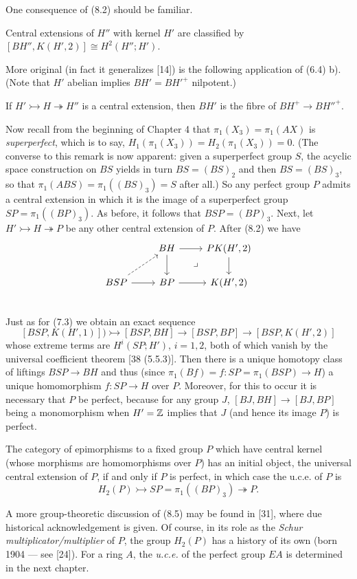 One consequence of (8.2) should be familiar.
\begin{corollary}
  Central extensions of $H''$ with kernel $H'$ are classified by $[BH'', K(H',2)]\cong H^2(H''; H')$.
\end{corollary}
More original (in fact it generalizes [14]) is the following application of (6.4) b). (Note that $H'$ abelian implies $BH' = {BH'}^+$ nilpotent.)
\begin{corollary}
  If $H'\rightarrowtail H \twoheadrightarrow H''$ is a central extension, then $BH'$ is the fibre of $BH^+ \longrightarrow {BH''}^+$.
\end{corollary}
Now recall from the beginning of Chapter 4 that $\pi_1(X_3) = \pi_1 (AX)$ is {\em superperfect}, which is to say, $H_1 (\pi_1 (X_3)) = H_2(\pi_1 (X_3)) = 0$. (The converse to this remark is now apparent: given a superperfect group $S$, the acyclic space construction on $BS$ yields in turn $BS = (BS)_2$ and then $BS = (BS)_3$, so that $\pi_1 (ABS) = \pi_1((BS)_3) = S$ after all.) So any perfect group $P$ admits a central extension in which it is the image of a superperfect group $SP = \pi_1((BP)_3)$. As before, it follows that $BSP = (BP)_3$. Next, let $H'\rightarrowtail H \twoheadrightarrow P$ be any other central extension of $P$. After (8.2)
we have
\[
\begin{tikzcd}
  & BH \arrow[d] \arrow[r] \arrow[dr, phantom, "\lrcorner"] &PK(H',2) \arrow[d] \\
 BSP \arrow[ru,dashrightarrow] \arrow[r] &BP \arrow[r] & K(H',2)\\  
\end{tikzcd}
\]
Just as for (7.3) we obtain an exact sequence
\[[BSP, K(H',1)] )\rightarrowtail [BSP, BH] \longrightarrow [BSP, BP] \longrightarrow [BSP, K(H',2)]\]
whose extreme terms are $H^i(SP; H')$, $i = 1, 2$, both of which vanish by the universal coefficient theorem [38 (5.5.3)]. Then there is a unique homotopy class of liftings $BSP \longrightarrow BH$ and thus (since $\pi_1 (Bf) = f\colon  SP = \pi_1 (BSP) \longrightarrow H$) a unique homomorphism $f\colon   SP \longrightarrow H$ over $P$. Moreover, for this to occur it is necessary that $P$ be perfect, because for any group $J$, $[BJ, BH] \longrightarrow [BJ, BP]$ being a monomorphism when $H'=\mathbb{Z}$ implies that $J$ (and hence its image $P$) is perfect.
\begin{prop}
  The category of epimorphisms to a fixed group $P$ which have central kernel (whose morphisms are homomorphisms over $P$) has an initial object, the universal central extension of $P$, if and only if $P$ is perfect, in which case the u.c.e. of $P$ is
\[H_2(P) \rightarrowtail SP = \pi_1((BP)_3)\twoheadrightarrow P .\]
\end{prop}
A more group-theoretic discussion of (8.5) may be found in [31], where due historical
acknowledgement is given. Of course, in its role as the {\em Schur multiplicator/multiplier} of $P$, the group $H_2(P)$ has a history of its own (born 1904 --- see [24]). For a ring $A$, the {\em u.c.e.} of the perfect group $EA$ is determined in the next chapter.


